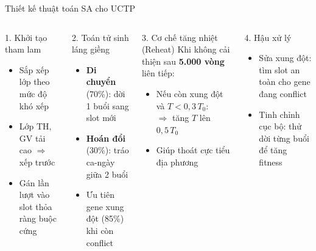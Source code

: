 \documentclass[aspectratio=169,10pt]{beamer}
\begin{document}
\begin{frame}{Thiết kế thuật toán SA cho UCTP}
\begin{columns}[T]
\begin{block}{1. Khởi tạo tham lam}
\begin{itemize}
  \item Sắp xếp lớp theo mức độ khó xếp
  \item Lớp TH, GV tải cao $\Rightarrow$ xếp trước
  \item Gán lần lượt vào slot thỏa ràng buộc cứng
\end{itemize}
\end{block}

\vspace{0.3cm}
\begin{block}{2. Toán tử sinh láng giềng}
\begin{itemize}
  \item \textbf{Di chuyển} (70\%): dời 1 buổi sang slot mới
  \item \textbf{Hoán đổi} (30\%): tráo ca-ngày giữa 2 buổi
  \item Ưu tiên gene xung đột (85\%) khi còn conflict
\end{itemize}
\end{block}

\begin{block}{3. Cơ chế tăng nhiệt (Reheat)}
Khi không cải thiện sau \textbf{5.000 vòng} liên tiếp:
\begin{itemize}
  \item Nếu còn xung đột và $T < 0{,}3\,T_0$:\\
  $\Rightarrow$ tăng $T$ lên $0{,}5\,T_0$
  \item Giúp thoát cực tiểu địa phương
\end{itemize}
\end{block}

\vspace{0.3cm}
\begin{block}{4. Hậu xử lý}
\begin{itemize}
  \item Sửa xung đột: tìm slot an toàn cho gene đang conflict
  \item Tinh chỉnh cục bộ: thử dời từng buổi để tăng fitness
\end{itemize}
\end{block}
\end{columns}
\end{frame}
\end{document}
